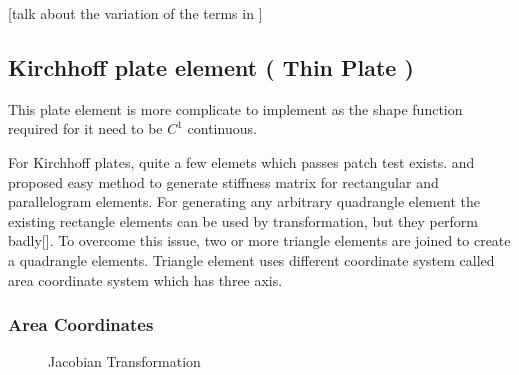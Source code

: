 \documentclass[main.tex]{subfiles}
\begin{document}
[talk about the variation of the terms in ]
\subsection{Kirchhoff plate element ( Thin Plate )}


This plate element is more complicate to implement as the shape function required for it need to be $C^1$ continuous.

For Kirchhoff plates, quite a few elemets which passes patch test exists. \cite{doi:10.1002/nme.1620020210} and \cite{doi:10.1680/iicep.1964.10014} proposed easy method to generate stiffness matrix for rectangular and parallelogram elements. For generating any arbitrary quadrangle element the existing rectangle elements can be used by transformation, but they perform badly[\cite{ZIENKIE_BOOK_STRUCT_CH11}]. To overcome this issue, two or more triangle elements are joined to create a quadrangle elements. Triangle element uses different coordinate system called area coordinate system which has three axis.

\subsubsection{Area Coordinates}


\begin{figure}[h!]
\centering


\caption{Jacobian Transformation} 
\label{fig:JacTrans}
\end{figure}
\end{document}
